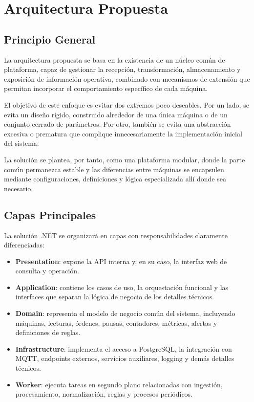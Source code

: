 \section{Arquitectura Propuesta}

\subsection{Principio General}

La arquitectura propuesta se basa en la existencia de un núcleo común de plataforma, capaz de gestionar la recepción, transformación, almacenamiento y exposición de información operativa, combinado con mecanismos de extensión que permitan incorporar el comportamiento específico de cada máquina.

El objetivo de este enfoque es evitar dos extremos poco deseables. Por un lado, se evita un diseño rígido, construido alrededor de una única máquina o de un conjunto cerrado de parámetros. Por otro, también se evita una abstracción excesiva o prematura que complique innecesariamente la implementación inicial del sistema.

La solución se plantea, por tanto, como una plataforma modular, donde la parte común permanezca estable y las diferencias entre máquinas se encapsulen mediante configuraciones, definiciones y lógica especializada allí donde sea necesario.

\subsection{Capas Principales}

La solución .NET se organizará en capas con responsabilidades claramente diferenciadas:

\begin{itemize}
    \item \textbf{Presentation}: expone la API interna y, en su caso, la interfaz web de consulta y operación.
    \item \textbf{Application}: contiene los casos de uso, la orquestación funcional y las interfaces que separan la lógica de negocio de los detalles técnicos.
    \item \textbf{Domain}: representa el modelo de negocio común del sistema, incluyendo máquinas, lecturas, órdenes, pausas, contadores, métricas, alertas y definiciones de reglas.
    \item \textbf{Infrastructure}: implementa el acceso a PostgreSQL, la integración con MQTT, endpoints externos, servicios auxiliares, logging y demás detalles técnicos.
    \item \textbf{Worker}: ejecuta tareas en segundo plano relacionadas con ingestión, procesamiento, normalización, reglas y procesos periódicos.
\end{itemize}

